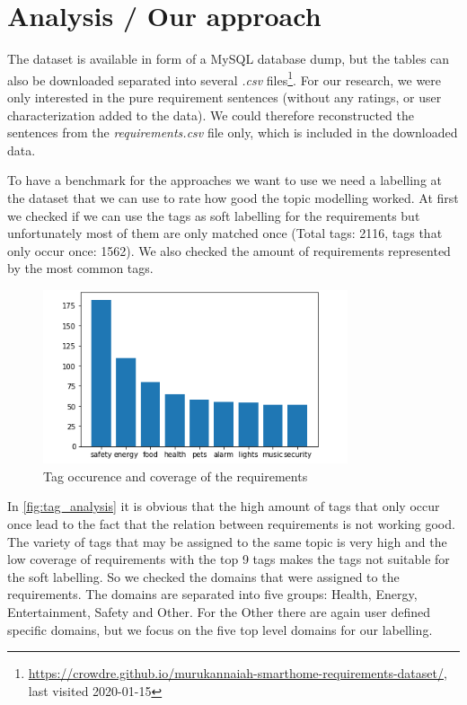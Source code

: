 \section{Analysis / Our approach} %
\label{sec:own_approach}

The \crowdre{} dataset is available in form of a MySQL database dump, but the tables can also be downloaded separated into several \textit{.csv} files\footnote{\url{https://crowdre.github.io/murukannaiah-smarthome-requirements-dataset/}, last visited 2020-01-15}. For our research, we were only interested in the pure requirement sentences (without any ratings, or user characterization added to the data). We could therefore reconstructed the sentences from the \textit{requirements.csv} file only, which is included in the downloaded data.

To have a benchmark for the approaches we want to use we need a labelling at the dataset that we can use to rate how good the topic modelling worked. At first we checked if we can use the tags as soft labelling for the requirements but unfortunately most of them are only matched once (Total tags: 2116, tags that only occur once: 1562). We also checked the amount of requirements represented by the most common tags. 

\begin{figure}[h]
  \centering
    \includegraphics[width=0.8\textwidth]{screenshots/tag_analysis.png}
    \caption{Tag occurence and coverage of the requirements}
    \label{fig:tag_analysis}
\end{figure}
\FloatBarrier

In \autoref{fig:tag_analysis} it is obvious that the high amount of tags that only occur once lead to the fact that the relation between requirements is not working good. The variety of tags that may be assigned to the same topic is very high and the low coverage of requirements with the top 9 tags makes the tags not suitable for the soft labelling. So we checked the domains that were assigned to the requirements. The domains are separated into five groups: Health, Energy, Entertainment, Safety and Other. For the \grqq{}Other\grqq{} there are again user defined specific domains, but we focus on the five top level domains for our labelling.

